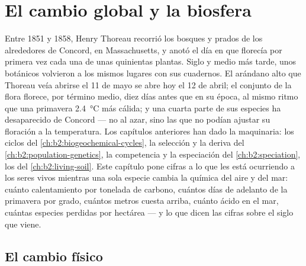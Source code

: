 \chapter{El cambio global y la biosfera}\label{ch:b2:global-change}

Entre 1851 y 1858, Henry Thoreau recorrió los bosques y prados de los
alrededores de Concord, en Massachusetts, y anotó el día en que florecía
por primera vez cada una de unas quinientas plantas. Siglo y medio más
tarde, unos botánicos volvieron a los mismos lugares con sus cuadernos. El
arándano alto que Thoreau veía abrirse el 11 de mayo se abre hoy el 12 de
abril; el conjunto de la flora florece, por término medio, diez días antes
que en su época, al mismo ritmo que una primavera \qty{2.4}{\celsius} más
cálida; y una cuarta parte de sus especies ha desaparecido de Concord --- no
al azar, sino las que no podían ajustar su floración a la temperatura. Los
capítulos anteriores han dado la maquinaria: los ciclos del
\cref{ch:b2:biogeochemical-cycles}, la selección y la deriva del
\cref{ch:b2:population-genetics}, la competencia y la especiación
del \cref{ch:b2:speciation}, los  del \cref{ch:b2:living-soil}.
Este capítulo pone cifras a lo que les está ocurriendo a los seres vivos
mientras una sola especie cambia la química del aire y del mar: cuánto
calentamiento por tonelada de carbono, cuántos días de adelanto de la
primavera por grado, cuántos metros cuesta arriba, cuánto ácido en el mar,
cuántas especies perdidas por hectárea --- y lo que dicen las cifras sobre
el siglo que viene.

\section{El cambio físico}

